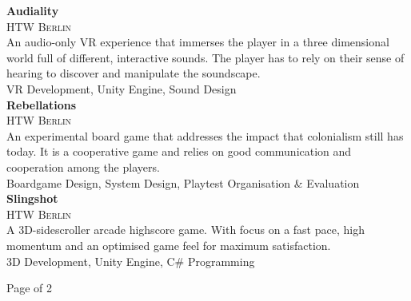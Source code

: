 \documentclass[oneside]{article}
\begin{document}
{\begin{minipage}[t][\dimexpr\textheight-2\fboxrule-2\fboxsep\relax][t]{\dimexpr0.6\textwidth-2\fboxrule-2\fboxsep\relax}
\begin{justify}
        {\large \textbf{Audiality}} \\
        {\scshape{}\selectfont\footnotesize HTW Berlin } \\
        An audio-only VR experience that immerses the player in a three dimensional world full of different, interactive sounds. The player has to rely on their sense of hearing to discover and manipulate the soundscape. \\[1ex]
        VR Development, Unity Engine, Sound Design \\

        {\large \textbf{Rebellations}} \\
        {\scshape{}\selectfont\footnotesize HTW Berlin } \\
        An experimental board game that addresses the impact that colonialism still has today. It is a cooperative game and relies on good communication and cooperation among the players. \\[1ex]
        Boardgame Design, System Design, Playtest Organisation \& Evaluation \\

        {\large \textbf{Slingshot}} \\
        {\scshape{}\selectfont\footnotesize HTW Berlin } \\
        A 3D-sidescroller arcade highscore game. With focus on a fast pace, high momentum and an optimised game feel for maximum satisfaction. \\[1ex]
        3D Development, Unity Engine, C\# Programming \\
        \end{justify}
        \vfill%
        {\hfill\small{}\selectfont Page \thepage of 2\hfill}
    \end{minipage}
}
\hfill%
\end{document}
